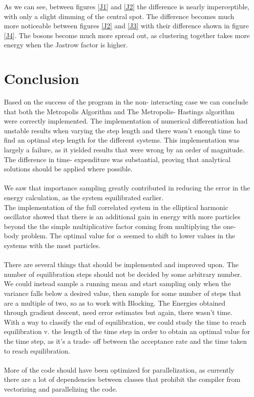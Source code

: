 \documentclass[11pt,a4paper,titlepage]{article}
\begin{document}
As we can see, between figures \ref{J1} and \ref{J2} the difference is nearly imperceptible, with only a slight dimming of the central spot. The difference becomes much more noticeable between figures \ref{J2} and \ref{J3} with their difference shown in figure \ref{J4}. The bosons become much more spread out, as clustering together takes more energy when the Jastrow factor is higher.




\section{Conclusion}
Based on the success of the program in the non- interacting case we can conclude that both the Metropolis Algorithm and The Metropolis- Hastings algorithm were correctly implemented. The implementation of numerical differentiation had unstable results when varying the step length and there wasn't enough time to find an optimal step length for the different systems. This implementation was largely a failure, as it yielded results that were wrong by an order of magnitude. The difference in time- expenditure was substantial, proving that analytical solutions should be applied where possible.\\\\We saw that importance sampling greatly contributed in reducing the error in the energy calculation, as the system equilibrated earlier.\\The implementation of the full correlated system in the elliptical harmonic oscillator showed that there is an additional gain in energy with more particles beyond the the simple multiplicative factor coming from multiplying the one- body problem. The optimal value for $\alpha$ seemed to shift to lower values in the systems with the most particles.\\\\There are several things that should be implemented and improved upon. The number of equilibration steps should not be decided by some arbitrary number. We could instead sample a running mean and start sampling only when the variance falls below a desired value, then sample for some number of steps that are a multiple of two, so as to work with Blocking. The Energies obtained through gradient descent, need error estimates but again, there wasn't time. \\ With a way to classify the end of equilibration, we could study the time to reach equilibration v. the length of the time step in order to obtain an optimal value for the time step, as it's a trade- off between the acceptance rate and the time taken to reach equilibration.\\\\More of the code should have been optimized for parallelization, as currently there are a lot of dependencies between classes that prohibit the compiler from vectorizing and parallelizing the code.
\end{document}
